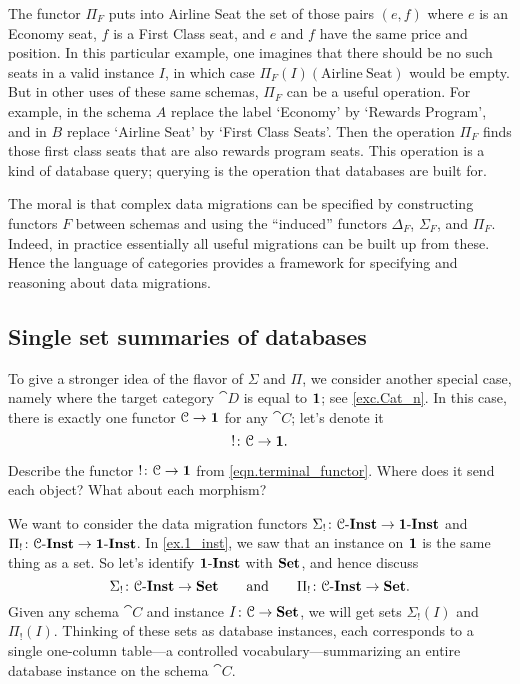 \documentclass[7Sketches]{subfiles}
\begin{document}
The functor $\Pi_F$ puts into Airline Seat the set of those pairs $(e,f)$ where
$e$ is an Economy seat, $f$ is a First Class seat, and $e$ and $f$ have the same
price and position. In this particular example, one imagines that there should
be no such seats in a valid instance $I$, in which case
$\Pi_F(I)(\mathrm{Airline\ Seat})$ would be empty. But in other uses of these
same schemas, $\Pi_F$ can be a useful operation. For example, in the schema $A$
replace the label `Economy' by `Rewards Program', and in $B$ replace `Airline
Seat' by `First Class Seats'. Then the operation $\Pi_F$ finds those first class
seats that are also rewards program seats. This operation is a kind of database
query; querying is the operation that databases are built
for.%

The moral is that complex data migrations can be specified by constructing
functors $F$ between schemas and using the ``induced'' functors $\Delta_F$, $\Sigma_F$, and $\Pi_F$.
Indeed, in practice essentially all useful migrations can be built up from these. Hence the language of categories provides a framework for specifying
and reasoning about data migrations.

\subsection{Single set summaries of databases}%

To give a stronger idea of the flavor of $\Sigma$ and $\Pi$, we consider another
special case, namely where the target category $\cat{D}$ is equal to $\mathbf{1}$; see \cref{exc.Cat_n}.
In this case, there is exactly one functor $\mathcal{C}\to\mathbf{1}$ for any
$\cat{C}$; let's denote it
\begin{equation}%
\label{eqn.terminal_functor}
	!\colon\cat{C}\to\Cat{1}.
\end{equation}

\begin{exercise} %
\label{ex.terminal_cat}
Describe the functor $!\colon \mathcal{C} \to \mathbf{1}$ from \cref{eqn.terminal_functor}. Where does it send each
object? What about each morphism?
\end{exercise}

We want to consider the data migration functors
$\Sigma_!\colon\mathcal{C}\textnormal{-}\mathbf{Inst}\to\mathbf{1}\textnormal{-}\mathbf{Inst}$ and
$\Pi_!\colon\mathcal{C}\textnormal{-}\mathbf{Inst}\to\mathbf{1}\textnormal{-}\mathbf{Inst}$. In \cref{ex.1_inst}, we saw that an
instance on $\mathbf{1}$ is the same thing as a set. So let's identify
$\mathbf{1}\textnormal{-}\mathbf{Inst}$ with $\mathbf{Set}$, and hence discuss
\[
	\Sigma_!\colon\mathcal{C}\textnormal{-}\mathbf{Inst}\to\mathbf{Set}
	\qquad\text{and}\qquad
	\Pi_!\colon\mathcal{C}\textnormal{-}\mathbf{Inst}\to\mathbf{Set}.
\]
Given any schema $\cat{C}$ and instance $I\colon\mathcal{C}\to\mathbf{Set}$, we will get
sets $\Sigma_!(I)$ and $\Pi_!(I)$. Thinking of these sets as database instances,
each corresponds to a single one-column table---a controlled
vocabulary---summarizing an entire database instance on the schema $\cat{C}$.
\end{document}
